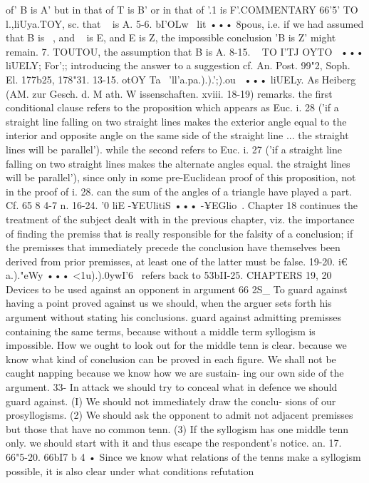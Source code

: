 {{{{{{of' B is A' but in that of T is B' or in that of '.1 is F'.COMMENTARY
66'5' TO l.,liUya.TOY, sc. that ~ is A.
5-6. bI'OLw~ lit ••• 8pous, i.e. if we had assumed that B is
~, and ~ is E, and E is Z, the impossible conclusion 'B is Z'
might remain.
7. TOUTOU, the assumption that B is A.
8-15. ~ TO I'TJ OYTO~ ••• liUELY; For';; introducing the answer
to a suggestion cf. An. Post. 99"2, Soph. El. 177b25, 178"31.
13-15. otOY Ta~ 'll'a.pa.).).';).ou~ ••• liUELy. As Heiberg (AM.
zur Gesch. d. M ath. W issenschaften. xviii. 18-19) remarks. the first
conditional clause refers to the proposition which appears as
Euc. i. 28 ('if a straight line falling on two straight lines makes the
exterior angle equal to the interior and opposite angle on the
same side of the straight line ... the straight lines will be parallel').
while the second refers to Euc. i. 27 ('if a straight line falling on
two straight lines makes the alternate angles equal. the straight
lines will be parallel'), since only in some pre-Euclidean proof
of this proposition, not in the proof of i. 28. can the sum of the
angles of a triangle have played a part. Cf. 65 8 4-7 n.
16-24. '0 liE -¥EUlitiS ••• -¥EGlio~. Chapter 18 continues the
treatment of the subject dealt with in the previous chapter, viz.
the importance of finding the premiss that is really responsible
for the falsity of a conclusion; if the premisses that immediately
precede the conclusion have themselves been derived from prior
premisses, at least one of the latter must be false.
19-20. i€ a.)."eWy ••• <1u).).0ywI'6~ refers back to 53bII-25.
CHAPTERS 19, 20
Devices to be used against an opponent in argument
66 2S_ To guard against having a point proved against us we
should, when the arguer sets forth his argument without stating
his conclusions. guard against admitting premisses containing the
same terms, because without a middle term syllogism is impossible.
How we ought to look out for the middle tenn is clear. because we
know what kind of conclusion can be proved in each figure. We
shall not be caught napping because we know how we are sustain-
ing our own side of the argument.
33- In attack we should try to conceal what in defence we should
guard against. (I) We should not immediately draw the conclu-
sions of our prosyllogisms. (2) We should ask the opponent to
admit not adjacent premisses but those that have no common
tenn. (3) If the syllogism has one middle tenn only. we should
start with it and thus escape the respondent's notice.
an. 17. 66"5-20. 66bI7
b 4 • Since we know what relations of the tenns make a
syllogism possible, it is also clear under what conditions refutation
}}}}}}
